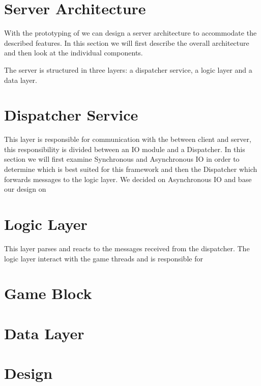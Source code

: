 \section{Server Architecture}
\label{sec:server}
With the prototyping of  we can design a server architecture to accommodate the described features. In this section we will first describe the overall architecture and then look at the individual components.


The server is structured in three layers: a dispatcher service, a logic layer and a data layer. 




\section{Dispatcher Service}
This layer is responsible for communication with the between client and server, this responsibility is divided between an IO module and a Dispatcher. In this section we will first examine Synchronous and Asynchronous IO in order to determine which is best suited for this framework and then the Dispatcher which forwards messages to the logic layer. We decided on Asynchronous IO and base our design on \cite{?} 	 %







\section{Logic Layer}
This layer parses and reacts to the messages received from the dispatcher. The logic layer interact with the game threads and is responsible for 




\section{Game Block}

\section{Data Layer}



\section{Design}
